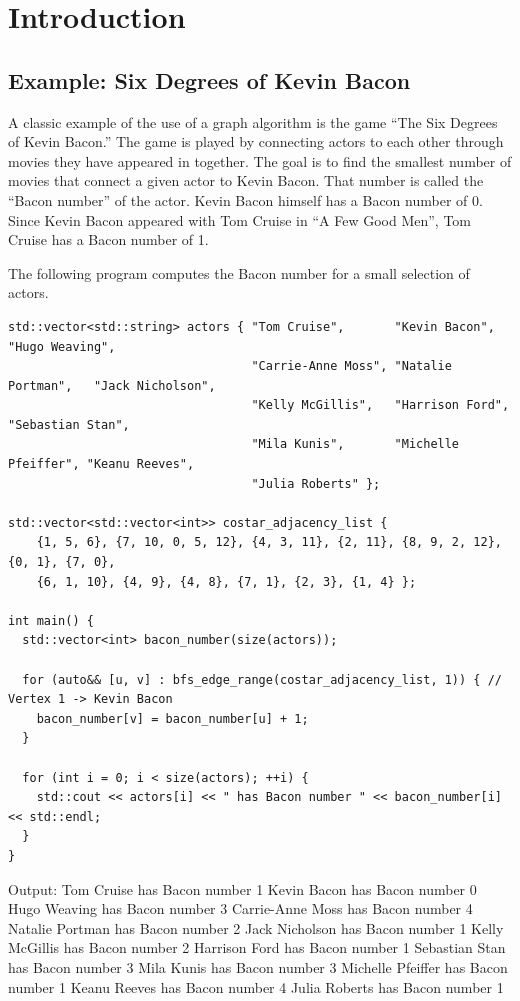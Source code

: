 
\chapter{Introduction}
\label{ch:introduction}


\section{Example: Six Degrees of Kevin Bacon}
\label{sec:bacon}

A classic example of the use of a graph algorithm is the game ``The Six Degrees of Kevin Bacon.''
The game is played by connecting actors to each other through movies they have appeared in together.
The goal is to find the smallest number of movies that connect a given actor to Kevin Bacon.
That number is called the ``Bacon number'' of the actor. Kevin Bacon himself has a Bacon number of 0.
Since Kevin Bacon appeared with Tom Cruise in ``A Few Good Men'', Tom Cruise has a Bacon number of 1.

The following program computes the Bacon number for a small selection of actors.
  {\small
\begin{lstlisting}
std::vector<std::string> actors { "Tom Cruise",       "Kevin Bacon",       "Hugo Weaving",
                                  "Carrie-Anne Moss", "Natalie Portman",   "Jack Nicholson",
                                  "Kelly McGillis",   "Harrison Ford",     "Sebastian Stan",
                                  "Mila Kunis",       "Michelle Pfeiffer", "Keanu Reeves",
                                  "Julia Roberts" };

std::vector<std::vector<int>> costar_adjacency_list {
    {1, 5, 6}, {7, 10, 0, 5, 12}, {4, 3, 11}, {2, 11}, {8, 9, 2, 12}, {0, 1}, {7, 0},
    {6, 1, 10}, {4, 9}, {4, 8}, {7, 1}, {2, 3}, {1, 4} };

int main() {
  std::vector<int> bacon_number(size(actors));

  for (auto&& [u, v] : bfs_edge_range(costar_adjacency_list, 1)) { // Vertex 1 -> Kevin Bacon
    bacon_number[v] = bacon_number[u] + 1;
  }

  for (int i = 0; i < size(actors); ++i) {
    std::cout << actors[i] << " has Bacon number " << bacon_number[i] << std::endl;
  }
}
\end{lstlisting}
}

  Output:
  { \small
Tom Cruise has Bacon number 1
Kevin Bacon has Bacon number 0
Hugo Weaving has Bacon number 3
Carrie-Anne Moss has Bacon number 4
Natalie Portman has Bacon number 2
Jack Nicholson has Bacon number 1
Kelly McGillis has Bacon number 2
Harrison Ford has Bacon number 1
Sebastian Stan has Bacon number 3
Mila Kunis has Bacon number 3
Michelle Pfeiffer has Bacon number 1
Keanu Reeves has Bacon number 4
Julia Roberts has Bacon number 1    
    }

